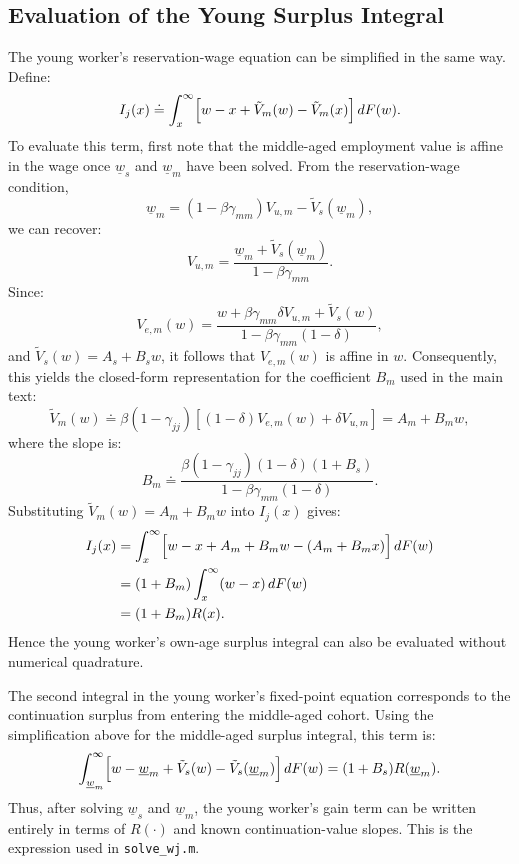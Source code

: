 \documentclass{article}
\begin{document}
\subsection{Evaluation of the Young Surplus Integral}
\label{app:young_surplus}

The young worker's reservation-wage equation can be simplified in the same way. Define:
\[
I_j(x)
\doteq
\int_x^\infty
\Bigl[
w-x+\tilde V_m(w)-\tilde V_m(x)
\Bigr]\,dF(w).
\]
To evaluate this term, first note that the middle-aged employment value is affine in the wage once $\underline w_s$ and $\underline w_m$ have been solved. From the reservation-wage condition,
\[
\underline w_m=(1-\beta\gamma_{mm})V_{u,m}-\tilde V_s(\underline w_m),
\]
we can recover:
\[
V_{u,m}
=
\frac{\underline w_m+\tilde V_s(\underline w_m)}
{1-\beta\gamma_{mm}}.
\]
Since:
\[
V_{e,m}(w)
=
\frac{
w+\beta\gamma_{mm}\delta V_{u,m}+\tilde V_s(w)
}{
1-\beta\gamma_{mm}(1-\delta)
},
\]
and $\tilde V_s(w)=A_s+B_s w$, it follows that $V_{e,m}(w)$ is affine in $w$. Consequently, this yields the closed-form representation for the coefficient $B_m$ used in the main text:
\[
\tilde V_m(w)
\doteq
\beta(1-\gamma_{jj})
\left[
(1-\delta)V_{e,m}(w)+\delta V_{u,m}
\right]
=A_m+B_m w,
\]
where the slope is:
\[
B_m
\doteq
\frac{\beta(1-\gamma_{jj})(1-\delta)(1+B_s)}
{1-\beta\gamma_{mm}(1-\delta)}.
\]
Substituting $\tilde V_m(w)=A_m+B_m w$ into $I_j(x)$ gives:
\begin{align*}
I_j(x)
&=
\int_x^\infty
\Bigl[
w-x+A_m+B_mw-(A_m+B_mx)
\Bigr]\,dF(w)\\
&=
(1+B_m)\int_x^\infty(w-x)\,dF(w)\\
&=(1+B_m)R(x).
\end{align*}
Hence the young worker's own-age surplus integral can also be evaluated without numerical quadrature.

The second integral in the young worker's fixed-point equation corresponds to the continuation surplus from entering the middle-aged cohort. Using the simplification above for the middle-aged surplus integral, this term is:
\[
\int_{\underline w_m}^{\infty}
\Bigl[
w-\underline w_m+\tilde V_s(w)-\tilde V_s(\underline w_m)
\Bigr]\,dF(w)
=
(1+B_s)R(\underline w_m).
\]
Thus, after solving $\underline w_s$ and $\underline w_m$, the young worker's gain term can be written entirely in terms of $R(\cdot)$ and known continuation-value slopes. This is the expression used in \texttt{solve\_wj.m}.
\end{document}
